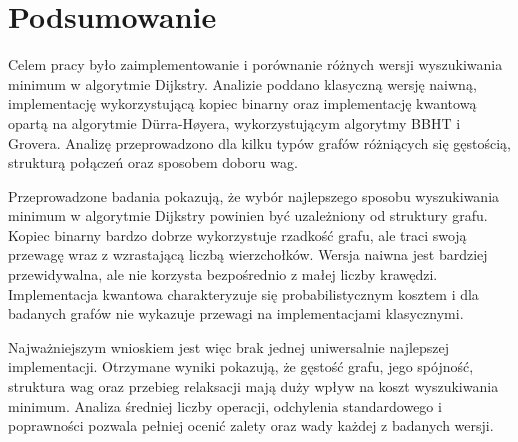 \chapter{Podsumowanie}
\label{chap:summary}

Celem pracy było zaimplementowanie i porównanie różnych wersji wyszukiwania minimum w algorytmie Dijkstry. Analizie poddano klasyczną wersję naiwną, implementację wykorzystującą kopiec binarny oraz implementację kwantową opartą na algorytmie Dürra-Høyera, wykorzystującym algorytmy BBHT i Grovera. Analizę przeprowadzono dla kilku typów grafów różniących się gęstością, strukturą połączeń oraz sposobem doboru wag.

Przeprowadzone badania pokazują, że wybór najlepszego sposobu wyszukiwania minimum w algorytmie Dijkstry powinien być uzależniony od struktury grafu. Kopiec binarny bardzo dobrze wykorzystuje rzadkość grafu, ale traci swoją przewagę wraz z wzrastającą liczbą wierzchołków. Wersja naiwna jest bardziej przewidywalna, ale nie korzysta bezpośrednio z małej liczby krawędzi. Implementacja kwantowa charakteryzuje się probabilistycznym kosztem i dla  badanych grafów nie wykazuje przewagi na implementacjami klasycznymi.

Najważniejszym wnioskiem jest więc brak jednej uniwersalnie najlepszej implementacji. Otrzymane wyniki pokazują, że gęstość grafu, jego spójność, struktura wag oraz przebieg relaksacji mają duży wpływ na koszt wyszukiwania minimum. Analiza średniej liczby operacji, odchylenia standardowego i poprawności pozwala pełniej ocenić zalety oraz wady każdej z badanych wersji.

